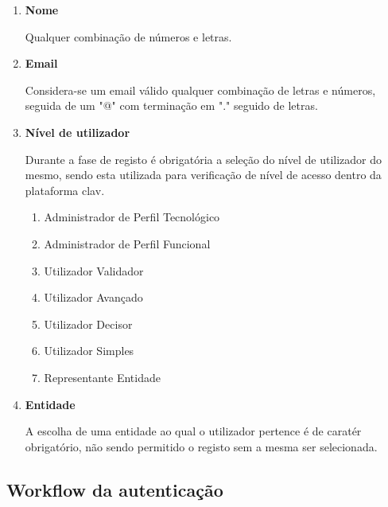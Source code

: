 \begin{enumerate}
    \item \textbf{Nome}
    
        Qualquer combinação de números e letras.
    \item \textbf{Email}
    
        Considera-se um email válido qualquer combinação de letras e números, seguida de um "@" com terminação em "." seguido de letras.
    \item \textbf{Nível de utilizador}
    
        Durante a fase de registo é obrigatória a seleção do nível de utilizador do mesmo, sendo esta utilizada para verificação de nível de acesso dentro da plataforma \gls{clav}.
    \begin{enumerate}
        \item Administrador de Perfil Tecnológico
        \item Administrador de Perfil Funcional
        \item Utilizador Validador
        \item Utilizador Avançado
        \item Utilizador Decisor
        \item Utilizador Simples
        \item Representante Entidade
    \end{enumerate}
    \item \textbf{Entidade}
    
        A escolha de uma entidade ao qual o utilizador pertence é de caratér obrigatório, não sendo permitido o registo sem a mesma ser selecionada.
\end{enumerate}

\cleardoublepage
\subsection{Workflow da autenticação}

